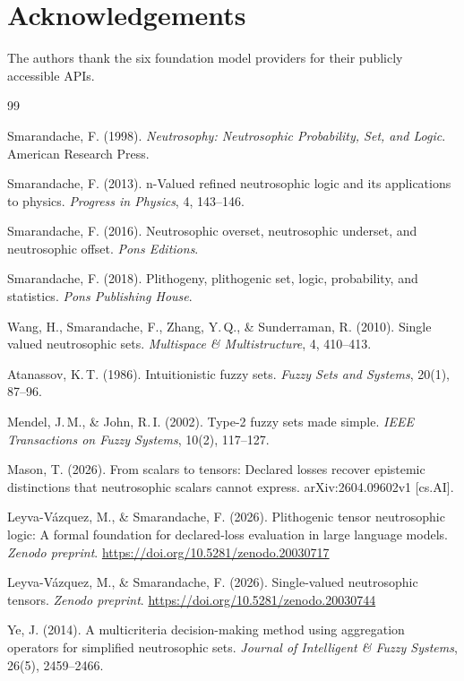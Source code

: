 \documentclass[10pt,a4paper]{article}
\begin{document}
\section*{Acknowledgements}
The authors thank the six foundation model providers
for their publicly accessible APIs.

\begin{thebibliography}{99}

Smarandache, F. (1998).
\textit{Neutrosophy: Neutrosophic Probability, Set, and Logic}.
American Research Press.

Smarandache, F. (2013).
n-Valued refined neutrosophic logic and its applications
to physics.
\textit{Progress in Physics}, 4, 143--146.

Smarandache, F. (2016).
Neutrosophic overset, neutrosophic underset, and
neutrosophic offset.
\textit{Pons Editions}.

Smarandache, F. (2018).
Plithogeny, plithogenic set, logic, probability, and
statistics.
\textit{Pons Publishing House}.

Wang, H., Smarandache, F., Zhang, Y.\,Q., \& Sunderraman, R. (2010).
Single valued neutrosophic sets.
\textit{Multispace \& Multistructure}, 4, 410--413.

Atanassov, K.\,T. (1986).
Intuitionistic fuzzy sets.
\textit{Fuzzy Sets and Systems}, 20(1), 87--96.

Mendel, J.\,M., \& John, R.\,I. (2002).
Type-2 fuzzy sets made simple.
\textit{IEEE Transactions on Fuzzy Systems}, 10(2), 117--127.

Mason, T. (2026).
From scalars to tensors: Declared losses recover
epistemic distinctions that neutrosophic scalars
cannot express.
arXiv:2604.09602v1 [cs.AI].

Leyva-V\'{a}zquez, M., \& Smarandache, F. (2026).
Plithogenic tensor neutrosophic logic: A formal
foundation for declared-loss evaluation in large
language models.
\textit{Zenodo preprint}.
\url{https://doi.org/10.5281/zenodo.20030717}

Leyva-V\'{a}zquez, M., \& Smarandache, F. (2026).
Single-valued neutrosophic tensors.
\textit{Zenodo preprint}.
\url{https://doi.org/10.5281/zenodo.20030744}

Ye, J. (2014).
A multicriteria decision-making method using
aggregation operators for simplified neutrosophic sets.
\textit{Journal of Intelligent \& Fuzzy Systems},
26(5), 2459--2466.

\end{thebibliography}
\end{document}
